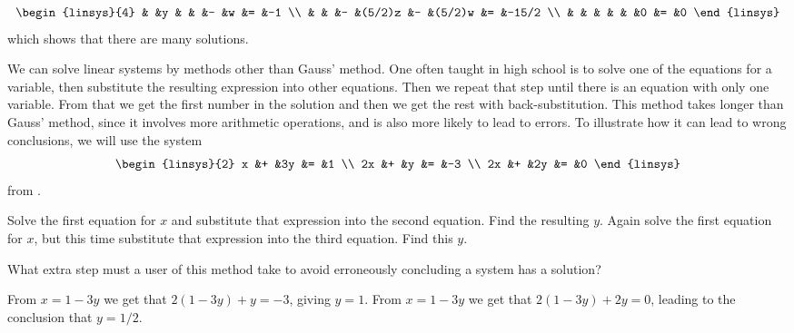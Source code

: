 \begin{exercises}
\begin{answer}
\begin{exparts}
\begin{equation*}
\begin{linsys}{4}
                   &   &y  &   &        &-  &w       &=  &-1 \\
                   &   &   &-  &(5/2)z  &-  &(5/2)w  &=  &-15/2  \\
                   &   &   &   &        &   &0       &=  &0 
             \end{linsys}
         \end{equation*}
         which shows that there are many solutions.
      \end{exparts} 
    \end{answer}
  \recommended \item 
    We can solve linear systems by methods other 
    than Gauss' method.
    One often taught in high school is to solve one of the 
    equations for a variable, then substitute the resulting expression into
    other equations.
    Then we repeat that step until there is an equation with only one
    variable.
    From that we get the first number in the solution and then we get the
    rest with  
    back-substitution.
    This method takes longer than Gauss' method, since it involves
    more arithmetic operations, and is also more
    likely to lead to errors.
    To illustrate how it can lead to wrong conclusions, we will use the system 
    \begin{equation*}
      \begin{linsys}{2}
            x  &+  &3y  &=  &1  \\
            2x  &+  &y   &=  &-3 \\
            2x  &+  &2y  &=  &0  
      \end{linsys}
    \end{equation*}
    from .
    \begin{exparts}
      \partsitem Solve the first equation for $x$ and 
        substitute that expression into the second equation.
        Find the resulting $y$.
      \partsitem Again solve the first equation for $x$, 
        but this time substitute that expression into the third equation.
        Find this $y$.
    \end{exparts}
    What extra step must a user of this method take to avoid 
    erroneously concluding a system has a solution?
    \begin{answer}
      \begin{exparts}
        \partsitem From $x=1-3y$ we get that $2(1-3y)+y=-3$, giving $y=1$.
        \partsitem From $x=1-3y$ we get that $2(1-3y)+2y=0$, leading to 
           the conclusion that $y=1/2$.

\end{exparts}
\end{answer}
\end{exercises}
